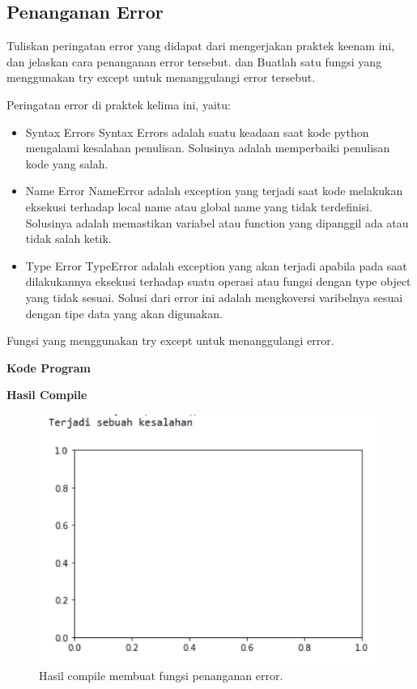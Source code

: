 \subsection{Penanganan Error}
Tuliskan  peringatan  error  yang  didapat  dari  mengerjakan  praktek  keenam  ini, dan  jelaskan  cara  penanganan  error  tersebut. dan  Buatlah  satu  fungsi  yang menggunakan try except untuk menanggulangi error tersebut.

\hfill \break
Peringatan error di praktek kelima ini, yaitu:
\begin{itemize}
	\item Syntax Errors
	Syntax Errors adalah suatu keadaan saat kode python mengalami kesalahan penulisan. Solusinya adalah memperbaiki penulisan kode yang salah.
	
	\item Name Error
	NameError adalah exception yang terjadi saat kode melakukan eksekusi terhadap local name atau global name yang tidak terdefinisi. Solusinya adalah memastikan variabel atau function yang dipanggil ada atau tidak salah ketik.
	
	\item Type Error
	TypeError adalah exception yang akan terjadi apabila pada saat dilakukannya eksekusi terhadap suatu operasi atau fungsi dengan type object yang tidak sesuai. Solusi dari error ini adalah mengkoversi varibelnya sesuai dengan tipe data yang akan digunakan.
\end{itemize}
\hfill \break
Fungsi yang menggunakan try except untuk menanggulangi error.

\hfill \break
\textbf{Kode Program}



\hfill \break
\textbf{Hasil Compile}

\begin{figure}[H]
	\includegraphics[width=12cm]{figures/6/1174034/Teori/error.png}
	\centering
	\caption{Hasil compile membuat fungsi penanganan error.}
\end{figure}